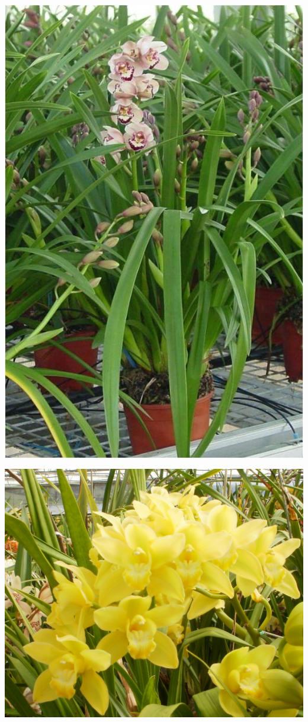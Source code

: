 \documentclass{article}
\begin{document}
\begin{center}
\includegraphics[height=0.9\textheight, angle=90]{../Cymbidium_Plant.jpg}
\end{center}
\newpage

\begin{center}
\includegraphics[height=0.9\textheight, angle=90]{../Cymbidium_Yellow.jpg}
\end{center}
\newpage
\end{document}
